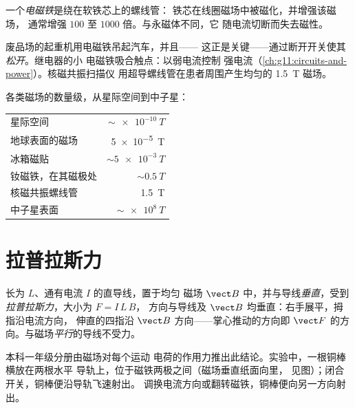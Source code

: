 \begin{definition}[电磁铁]\label{def:g11:magnetic-fields:electromagnet}
一个\emph{电磁铁}是绕在软铁芯上的螺线管：
铁芯在线圈磁场中被磁化，并增强该磁场，
通常增强 $100$ 至 $1000$ 倍。与永磁体不同，它
随电流切断而失去磁性。
\end{definition}

\begin{remark}[三种装置]\label{rem:g11:magnetic-fields:machines}
废品场的起重机用电磁铁吊起汽车，并且——
这正是关键——通过断开开关使其\emph{松开}。继电器的小
电磁铁吸合触点：以弱电流控制
强电流（\cref{ch:g11:circuits-and-power}）。核磁共振扫描仪
用超导螺线管在患者周围产生均匀的 \qty{1.5}{T} 磁场。
\end{remark}

各类磁场的数量级，从星际空间到中子星：
\begin{center}
\small
\begin{tabular}{lr}
星际空间 & $\sim \qty{e-10}{T}$ \\
地球表面的磁场 & \qty{5e-5}{T} \\
冰箱磁贴 & $\sim \qty{5e-3}{T}$ \\
钕磁铁，在其磁极处 & $\sim \qty{0.5}{T}$ \\
核磁共振螺线管 & \qty{1.5}{T} \\
中子星表面 & $\sim \qty{e8}{T}$ \\
\end{tabular}
\end{center}

\section{拉普拉斯力}

\begin{proposition}[拉普拉斯力]\label{prop:g11:magnetic-fields:laplace}
长为 $L$、通有电流 $I$ 的直导线，置于均匀
磁场 $\vect B$ 中，并与导线\emph{垂直}，受到
\emph{拉普拉斯力}，大小为 $F = I\,L\,B$，
方向与导线及 $\vect B$ 均垂直：右手展平，拇指沿电流方向，
伸直的四指沿 $\vect B$ 方向——掌心推动的方向即
$\vect F$ 的方向。与磁场\emph{平行}的导线不受力。
\end{proposition}
\admitted

\begin{remark}[跳动的导轨]\label{rem:g11:magnetic-fields:rail}
本科一年级分册由磁场对每个运动
电荷的作用力推出此结论。实验中，一根铜棒横放在两根水平
导轨上，位于磁铁两极之间（磁场垂直纸面向里，
见图）；闭合开关，铜棒便沿导轨飞速射出。
调换电流方向或翻转磁铁，铜棒便向另一方向射出。
\end{remark}


